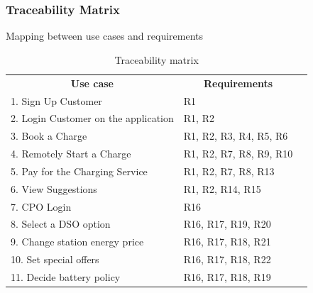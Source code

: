 \subsubsection{Traceability Matrix}
Mapping between use cases and requirements
\begin{table}[H]
    \centering
    \begin{tabular}{|l|l|l}
    \cline{1-2}
    \multicolumn{1}{|c|}{\textbf{Use case}} & \multicolumn{1}{c|}{\textbf{Requirements}} &  \\ \cline{1-2}
    1. Sign Up Customer                                         & R1                                                        &  \\ \cline{1-2}
    2. Login Customer on the application                        & R1, R2                                                    &  \\ \cline{1-2}
    3. Book a Charge                                            & R1, R2, R3, R4, R5, R6                                    &  \\ \cline{1-2}
    4. Remotely Start a Charge                                  & R1, R2, R7, R8, R9, R10                                   &  \\  \cline{1-2}
    5. Pay for the Charging Service                             & R1, R2, R7, R8, R13                                       &  \\ \cline{1-2}
    6. View Suggestions                                         & R1, R2, R14, R15                                          &  \\ \cline{1-2}
    7. CPO Login                                                & R16                                                       &  \\ \cline{1-2}
    8. Select a DSO option                                      & R16, R17, R19, R20                                        &  \\ \cline{1-2}
    9. Change station energy price                              & R16, R17, R18, R21                                        &  \\ \cline{1-2}
    10. Set special offers                                      & R16, R17, R18, R22                                        &  \\ \cline{1-2}
    11. Decide battery policy                                   & R16, R17, R18, R19                                        &  \\ \cline{1-2}


    \end{tabular}
    \caption{Traceability matrix}
    \end{table}
    
